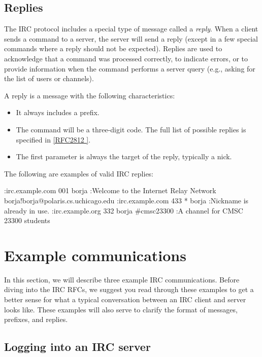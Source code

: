 \documentclass[10pt]{article}
\newcommand{\RFCsection}[2]{\href{http://tools.ietf.org/html/rfc#1\#section-#2}{[RFC#1 \textsection #2]}}
\newenvironment{example}%
{\VerbatimEnvironment\begin{Sbox}\begin{VerbExample}}%
{\end{VerbExample}\end{Sbox}\setlength{\fboxsep}{8pt}\begin{center}\fcolorbox{black}{backgroundgray}{\TheSbox}\end{center}}
\begin{document}
\subsection{Replies}

The IRC protocol includes a special type of message called a \emph{reply}. When a client sends a command to a server, the server will send a reply (except in a few special commands where a reply should not be expected). Replies are used to acknowledge that a command was processed correctly, to indicate errors, or to provide information when the command performs a server query (e.g., asking for the list of users or channels).

A reply is a message with the following characteristics:

\begin{itemize}
\item It always includes a prefix.
\item The command will be a three-digit code. The full list of possible replies is specified in \RFCsection{2812}{5}.
\item The first parameter is always the target of the reply, typically a nick.
\end{itemize}

The following are examples of valid IRC replies:

\begin{example}
:irc.example.com 001 borja :Welcome to the Internet Relay Network borja!borja@polaris.cs.uchicago.edu
:irc.example.com 433 * borja :Nickname is already in use.
:irc.example.org 332 borja #cmsc23300 :A channel for CMSC 23300 students
\end{example}

\section{Example communications}
\label{sec:examples}

In this section, we will describe three example IRC communications. Before diving into the IRC RFCs, we suggest you read through these examples to get a better sense for what a typical conversation between an IRC client and server looks like. These examples will also serve to clarify the format of messages, prefixes, and replies.

\subsection{Logging into an IRC server}
\label{sec:logging}
\end{document}
